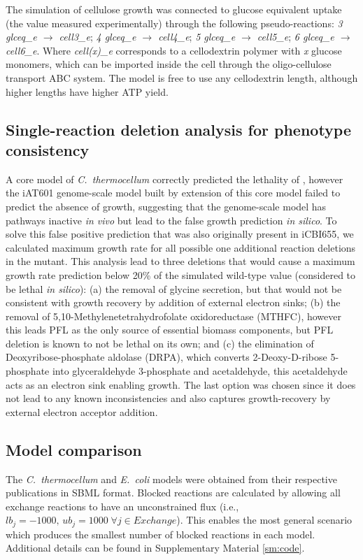The simulation of cellulose growth was connected to glucose equivalent
uptake (the value measured experimentally) through the following
pseudo-reactions:
\textit{3 glceq\_e $\rightarrow$ cell3\_e}; \textit{4 glceq\_e $\rightarrow$ cell4\_e};
\textit{5 glceq\_e $\rightarrow$ cell5\_e}; \textit{6 glceq\_e $\rightarrow$ cell6\_e}.
Where \textit{cell(x)\_e} corresponds to a cellodextrin polymer with \textit{x} glucose monomers, which can be imported inside the cell through the oligo-cellulose transport ABC system. The model is free to use any cellodextrin length, although higher lengths have higher ATP yield. \citep{zhang2005, thompson2016}

\subsection{Single-reaction deletion analysis for phenotype consistency}\label{sec:deletion_analysis}
A core model of \textit{C.~thermocellum}\citep{thompson2015} correctly predicted the lethality of , however the iAT601 genome-scale model built by extension of this core model failed to predict the absence of growth, suggesting that the genome-scale model has pathways inactive \textit{in vivo} but lead to the false growth prediction \textit{in silico}.  To solve this false positive prediction that was also originally present in iCBI655, we calculated maximum growth rate for all possible one additional reaction deletions in the  mutant. This analysis lead to three deletions that would cause a maximum growth rate prediction below 20\% of the simulated wild-type value (considered to be lethal \textit{in silico}\citep{palsson2015}):
(a) the removal of glycine secretion, but that would not be consistent with growth recovery by addition of external electron sinks;
(b) the removal of 5,10-Methylenetetrahydrofolate oxidoreductase (MTHFC), however this leads PFL as the only source of essential biomass components, but PFL deletion is known to not be lethal on its own;\citep{papanek2015}
and (c) the elimination of Deoxyribose-phosphate aldolase (DRPA), which converts
2-Deoxy-D-ribose 5-phosphate into glyceraldehyde 3-phosphate and acetaldehyde, this acetaldehyde acts as an electron sink enabling growth.
The last option was chosen since it does not lead to any known inconsistencies and also captures growth-recovery by external electron acceptor addition.\citep{thompson2015}

\subsection{Model comparison}
The \textit{C.~thermocellum} and \textit{E.~coli} models were obtained from their respective publications in SBML format.
Blocked reactions are calculated by allowing all exchange reactions to have an unconstrained flux (i.e., $lb_j=-1000,\, ub_j=1000 \; \forall j \in \mathit{Exchange}$).
This enables the most general scenario which produces the smallest number of blocked reactions in each model. Additional details can be found in Supplementary Material \ref{sm:code}.

